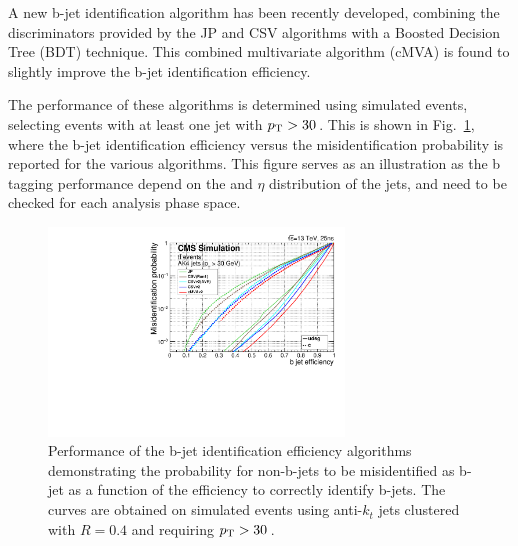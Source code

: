 A new b-jet identification algorithm has been recently developed, combining the discriminators provided by the JP and CSV algorithms with a Boosted Decision Tree (BDT) technique. This combined multivariate algorithm (cMVA) is found to slightly improve the b-jet identification efficiency.

The performance of these algorithms is determined using simulated \ttbar events, selecting events with at least one jet with $p_\mathrm{T} > 30$\,\GeV. This is shown in Fig.~\ref{fig:btagperf}, where the b-jet identification efficiency versus the misidentification probability is reported for the various algorithms. This figure serves as an illustration as the b tagging performance depend on the \pt and $\eta$ distribution of the jets, and need to be checked for each analysis phase space.

\begin{figure}[htb]
\centering
\includegraphics[width=0.7\textwidth]{images/btagperf.pdf}
\caption{Performance of the b-jet identification efficiency algorithms demonstrating the probability for non-b-jets to be misidentified as b-jet as a function of the efficiency to correctly identify b-jets. The curves are obtained on simulated \ttbar events using anti-$k_t$ jets clustered with $R=0.4$ and requiring $p_\mathrm{T}>30$\,\GeV.}\label{fig:btagperf}
\end{figure}


